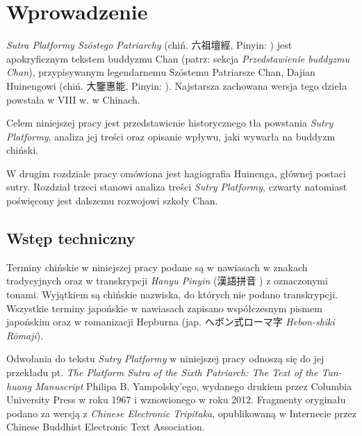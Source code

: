 \chapter*{Wprowadzenie}
\setcounter{chapter}{1}
\textit{Sutra Platformy Szóstego Patriarchy} (chiń. 六祖壇經, Pinyin: ) jest apokryficznym tekstem buddyzmu Chan (patrz: sekcja \textit{Przedstawienie buddyzmu Chan}), przypisywanym legendarnemu Szóstemu Patriarsze Chan, Dajian Huinengowi (chiń. 大鑒惠能, Pinyin: ). Najstarsza zachowana wersja tego dzieła powstała w VIII w. w Chinach.

Celem niniejszej pracy jest przedstawienie historycznego tła powstania \textit{Sutry Platformy}, analiza jej treści oraz opisanie wpływu, jaki wywarła na buddyzm chiński.

W drugim rozdziale pracy omówiona jest hagiografia Huinenga, głównej postaci sutry.
Rozdział trzeci stanowi analiza treści \textit{Sutry Platformy}, czwarty natomiast poświęcony jest dalszemu rozwojowi szkoły Chan.

\section{Wstęp techniczny}
Terminy chińskie w niniejszej pracy podane są w nawiasach w znakach tradycyjnych oraz w transkrypcji \textit{Hanyu Pinyin} (漢語拼音 ) z oznaczonymi tonami. Wyjątkiem są chińskie nazwiska, do których nie podano transkrypcji.
Wszystkie terminy japońskie w nawiasach zapisano współczesnym pismem japońskim oraz w romanizacji Hepburna (jap. {\ipaexgothic ヘボン式ローマ字} \textit{Hebon-shiki Rōmaji}).

Odwołania do tekstu \textit{Sutry Platformy} w niniejszej pracy odnoszą się do jej przekładu pt. \textit{The Platform Sutra of the Sixth Patriarch: The Text of the Tun-huang Manuscript} Philipa B. Yampolsky'ego, wydanego drukiem przez Columbia University Press w roku 1967 i wznowionego w roku 2012.
Fragmenty oryginału podano za wersją z \textit{Chinese Electronic Tripitaka}, opublikowaną w Internecie przez Chinese Buddhist Electronic Text Association.

